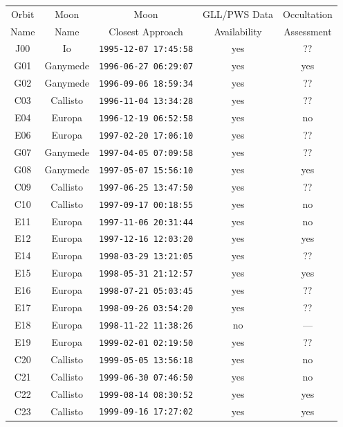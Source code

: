 \documentclass[referee]{aa}
\begin{document}
\begin{table}[]
    \centering
    \begin{tabular}{c|c|c|c|c}

\hline 
Orbit & Moon &        Moon      &  GLL/PWS Data  &  Occultation \\
Name  & Name & Closest Approach &  Availability  &  Assessment \\
\hline
J00 & Io       & \texttt{1995-12-07 17:45:58} & yes & ??  \\
\rowcolor{LightGray}
G01 & Ganymede & \texttt{1996-06-27 06:29:07} & yes & yes \\
G02 & Ganymede & \texttt{1996-09-06 18:59:34} & yes & ??  \\
C03 & Callisto & \texttt{1996-11-04 13:34:28} & yes & ??  \\
E04 & Europa   & \texttt{1996-12-19 06:52:58} & yes & no  \\
E06 & Europa   & \texttt{1997-02-20 17:06:10} & yes & ??  \\
G07 & Ganymede & \texttt{1997-04-05 07:09:58} & yes & ??  \\
G08 & Ganymede & \texttt{1997-05-07 15:56:10} & yes & yes \\
C09 & Callisto & \texttt{1997-06-25 13:47:50} & yes & ??  \\
C10 & Callisto & \texttt{1997-09-17 00:18:55} & yes & no  \\
E11 & Europa   & \texttt{1997-11-06 20:31:44} & yes & no  \\
\rowcolor{LightGray}
E12 & Europa   & \texttt{1997-12-16 12:03:20} & yes & yes \\
E14 & Europa   & \texttt{1998-03-29 13:21:05} & yes & ??  \\
E15 & Europa   & \texttt{1998-05-31 21:12:57} & yes & yes \\
E16 & Europa   & \texttt{1998-07-21 05:03:45} & yes & ??  \\
E17 & Europa   & \texttt{1998-09-26 03:54:20} & yes & ??  \\
E18 & Europa   & \texttt{1998-11-22 11:38:26} & no  & --- \\
E19 & Europa   & \texttt{1999-02-01 02:19:50} & yes & ??  \\
C20 & Callisto & \texttt{1999-05-05 13:56:18} & yes & no  \\
C21 & Callisto & \texttt{1999-06-30 07:46:50} & yes & no  \\
C22 & Callisto & \texttt{1999-08-14 08:30:52} & yes & yes \\
C23 & Callisto & \texttt{1999-09-16 17:27:02} & yes & yes \\

\end{tabular}
\end{table}
\end{document}
